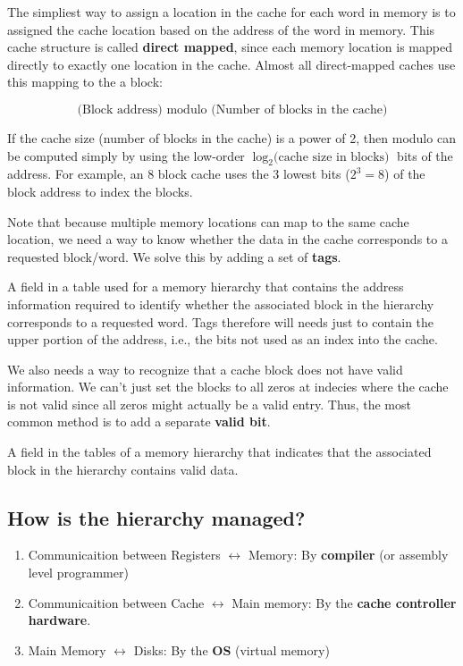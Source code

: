 \documentclass[12pt]{article}
\begin{document}
The simpliest way to assign a location in the cache for each word in memory is to assigned the cache location based on the address of the word in memory. This cache structure is called \textbf{direct mapped}, since each memory location is mapped directly to exactly one location in the cache. Almost all direct-mapped caches use this mapping to the a block:

$$
    \text{(Block address) modulo (Number of blocks in the cache)}
$$

If the cache size (number of blocks in the cache) is a power of 2, then modulo can be computed simply by using the low-order $\log_2\text{(cache size in blocks)}$ bits of the address. For example, an 8 block cache uses the 3 lowest bits ($2^3 = 8$) of the block address to index the blocks.

Note that because multiple memory locations can map to the same cache location, we need a way to know whether the data in the cache corresponds to a requested block/word. We solve this by adding a set of \textbf{tags}.
\begin{definition}[Tag]
    A field in a table used for a memory hierarchy that contains the address information required to identify whether the associated block in the hierarchy corresponds to a requested word. Tags therefore will needs just to contain the upper portion of the address, i.e., the bits not used as an index into the cache.
\end{definition}

We also needs a way to recognize that a cache block does not have valid information. We can't just set the blocks to all zeros at indecies where the cache is not valid since all zeros might actually be a valid entry. Thus, the most common method is to add a separate \textbf{valid bit}.
\begin{definition}
    A field in the tables of a memory hierarchy that indicates that the associated block in the hierarchy contains valid data.
\end{definition}
\subsection*{How is the hierarchy managed?}
\begin{enumerate}
    \item Communicaition between Registers $\leftrightarrow$ Memory: By \textbf{compiler} (or assembly level programmer)
    \item Communicaition between Cache $\leftrightarrow$ Main memory: By the \textbf{cache controller hardware}.
    \item Main Memory $\leftrightarrow$ Disks: By the \textbf{OS} (virtual memory)
\end{enumerate}
\end{document}
